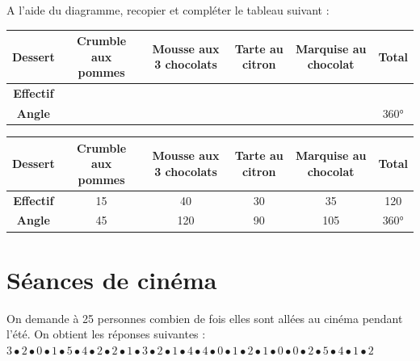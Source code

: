 \documentclass[a4paper,11pt]{exam}
\begin{document}
	\begin{questions}
		\question A l'aide du diagramme, recopier et compléter le tableau suivant :
	
		\begin{footnotesize}
			\begin{tabular}{|@{\ }c@{\ }|@{\ }c@{\ }|@{\ }c@{\ }|@{\ }c@{\ }|@{\ }c@{\ }|@{\ }c@{\ }|}
				\hline
				\textbf{Dessert} & \textbf{Crumble aux pommes} & \textbf{Mousse aux 3 chocolats} & \textbf{Tarte au citron}  & \textbf{Marquise au chocolat} & \textbf{Total}\\
				\hline
				\textbf{Effectif} &  &   &  &  & \\
				\hline
				\textbf{Angle} &  &   &  &  & 360°\\ 
				\hline
			\end{tabular}
		\end{footnotesize}
	
		
		
		\begin{solution}
			\begin{footnotesize}
				\begin{tabular}{|@{\ }c@{\ }|@{\ }c@{\ }|@{\ }c@{\ }|@{\ }c@{\ }|@{\ }c@{\ }|@{\ }c@{\ }|}
					\hline
					\textbf{Dessert} & \textbf{Crumble aux pommes} & \textbf{Mousse aux 3 chocolats} & \textbf{Tarte au citron}  & \textbf{Marquise au chocolat} & \textbf{Total}\\
					\hline
					\textbf{Effectif} & 15 & 40  & 30 & 35 & 120 \\
					\hline
					\textbf{Angle} & 45 & 120  & 90 & 105 & 360°\\ 
					\hline
				\end{tabular}
			\end{footnotesize}
		\end{solution}
	\end{questions}
	
\section{Séances de cinéma}

	On demande à 25 personnes combien de fois elles sont allées au cinéma pendant l'été. On obtient les réponses suivantes : \\
	
	$3 \bullet 2 \bullet 0 \bullet 1 \bullet 5 \bullet 4 \bullet 2 \bullet 2 \bullet 1 \bullet 3 \bullet 2 \bullet 1 \bullet 4 \bullet 4 \bullet 0 \bullet 1 \bullet 2 \bullet 1 \bullet 0 \bullet 0 \bullet 2 \bullet 5 \bullet 4 \bullet 1 \bullet 2$
	
\end{document}
